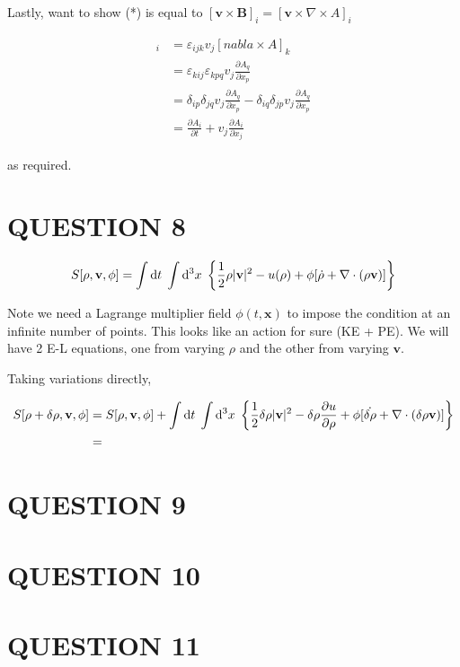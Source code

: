 \documentclass[a4paper]{article}
\begin{document}
Lastly, want to show (*) is equal to $[  \mathbf{v} \times \mathbf{B}  ]_{i} = [\mathbf{v} \times \nabla \times A ]_{i}   $

\begin{align*}
[\mathbf{v} \times \nabla \times A ]_{i} & = \varepsilon_{ijk} v_{j} [nabla \times A ]_{k}  \\
& = \varepsilon_{kij}\varepsilon_{kpq} v_{j} \frac{\partial A_{q} }{\partial x_{p}}  \\
& = \delta_{ip}\delta_{jq} v_{j} \frac{\partial A_{q} }{\partial x_{p}} - \delta_{iq}\delta_{jp} v_{j} \frac{\partial A_{q} }{\partial x_{p}} \\
& = \frac{\partial A_{i} }{\partial t} +  v_{j} \frac{\partial A_{i} }{\partial x_{j}}
\end{align*}

as required.


\section{QUESTION 8}


\[ S[\rho, \mathbf{v},\phi] =  \int  \mathrm{d} t \;  \int \mathrm{d}^{3}  x  \;  \left\{  \frac{1}{2} \rho | \mathbf{v} |^{2} - u(\rho) + \phi [   \dot{\rho} + \nabla \cdot ( \rho \mathbf{v}) ] \right\}  \]

Note we need a Lagrange multiplier field $ \phi(t,\mathbf{x}) $ to impose the condition at an infinite number of points. This looks like an action for sure (KE + PE). We will have 2 E-L equations, one from varying $ \rho $ and the other from varying $ \mathbf{v}  $.



Taking variations directly,

\begin{align*}
S[\rho + \delta \rho , \mathbf{v},\phi] & = S[\rho, \mathbf{v},\phi] + \int  \mathrm{d} t \;  \int \mathrm{d}^{3}  x  \;  \left\{  \frac{1}{2} \delta \rho | \mathbf{v} |^{2} - \delta \rho \frac{\partial u }{\partial \rho} + \phi [   \dot{\delta \rho} +  \nabla \cdot ( \delta \rho \mathbf{v}) ] \right\} \\
& = \end{align*}
\section{QUESTION 9}


\section{QUESTION 10}
\section{QUESTION 11}
\end{document}
